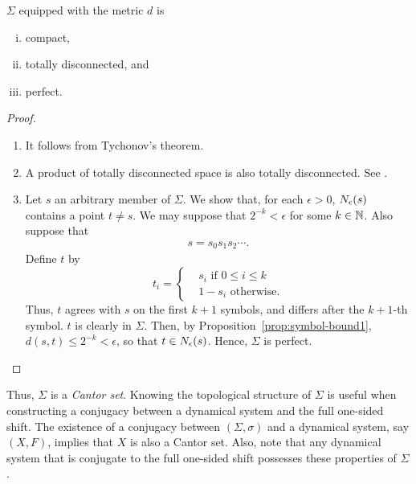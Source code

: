 \documentclass[10pt,twoside]{book}
\begin{document}
\begin{proposition}
  $\Sigma$ equipped with the metric $d$ is 
  \begin{enumerate}[(i)]
    \item compact,
    \item totally disconnected, and
    \item perfect.
  \end{enumerate}
  \begin{proof}
    \begin{enumerate}
      \item 
        It follows from Tychonov's theorem.
      \item
        A product of totally disconnected space is also totally disconnected.
        See \citet{dugundji}.
      \item
        Let $s$ an arbitrary member of $\Sigma$.
        We show that, for each $\epsilon > 0$, $N_{\epsilon}(s)$ contains a point $t \neq s$.
        We may suppose that $2^{-k} < \epsilon$ for some $k \in \mathbb{N}$.
        Also suppose that
        \begin{align*}
          s = s_0 s_1 s_2 \cdots.
        \end{align*}
        Define $t$ by
        \begin{equation*}
          t_i = \begin{cases}
            &s_i \mbox{ if } 0 \leq i \leq k  \\
            &1 - s_i \mbox{ otherwise.}
          \end{cases}
        \end{equation*}
        Thus, $t$ agrees with $s$ on the first $k+1$ symbols, and differs after the $k+1$-th symbol.
        $t$ is clearly in $\Sigma$.
        Then, by Proposition~\ref{prop:symbol-bound1}, $d(s,t) \leq 2^{-k} < \epsilon$, so that $t \in N_{\epsilon}(s)$.
        Hence, $\Sigma$ is perfect.
    \end{enumerate}
  \end{proof}
\end{proposition}
Thus, $\Sigma$ is a \textit{Cantor set}.
Knowing the topological structure of $\Sigma$ is useful when constructing a conjugacy between a dynamical system and the full one-sided shift.
The existence of a conjugacy between $(\Sigma, \sigma)$ and a dynamical system, say $(X, F)$, implies that $X$ is also a Cantor set.
Also, note that any dynamical system that is conjugate to the full one-sided shift possesses these properties of $\Sigma$ \citep{dugundji}.
\end{document}
